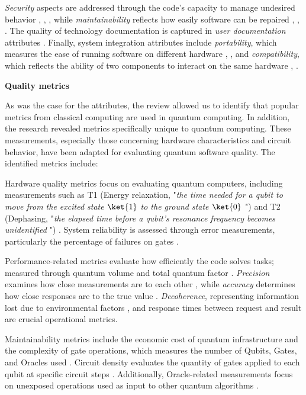 \textit{Security} aspects are addressed through the code's capacity to manage undesired behavior \cite{Wang2023}, \cite{Faryal2022}, \cite{30}, while \textit{maintainability} reflects how easily software can be repaired \cite{Wang2023}, \cite{Faryal2022}, \cite{30}. The quality of technology documentation is captured in \textit{user documentation} attributes \cite{Wang2023}. Finally, system integration attributes include \textit{portability}, which measures the ease of running software on different hardware \cite{Faryal2022}, \cite{30}, and \textit{compatibility}, which reflects the ability of two components to interact on the same hardware \cite{Faryal2022}, \cite{30}.

\noindent\textbf{Quality metrics}

As was the case for the attributes, the review allowed us to identify that popular metrics from classical computing are used in quantum computing. In addition, the research revealed metrics specifically unique to quantum computing. These measurements, especially those concerning hardware characteristics and circuit behavior, have been adapted for evaluating quantum software quality. The identified metrics include:

Hardware quality metrics focus on evaluating quantum computers, including measurements such as T1 (Energy relaxation, "\textit{the time needed for a qubit to move from the excited state $\ket{1}$ to the ground state $\ket{0}$} \cite{youssefMeasuringSimulatingT12020}") and T2 (Dephasing, "\textit{the elapsed time before a qubit's resonance frequency becomes unidentified} \cite{youssefMeasuringSimulatingT12020}") \cite{Alam2019}. System reliability is assessed through error measurements, particularly the percentage of failures on gates \cite{Alam2019}.

Performance-related metrics evaluate how efficiently the code solves tasks; measured through quantum volume and total quantum factor \cite{Verduro2021}. \textit{Precision} examines how close measurements are to each other \cite{Moguel2022}, while \textit{accuracy} determines how close responses are to the true value \cite{Verduro2021}. \textit{Decoherence}, representing information lost due to environmental factors \cite{Verduro2021}, and response times between request and result \cite{Moguel2022} are crucial operational metrics.

Maintainability metrics include the economic cost of quantum infrastructure \cite{Moguel2022} and the complexity of gate operations, which measures the number of Qubits, Gates, and Oracles used \cite{Moguel2022, 40, Díaz_Alvarado-Valiente_Romero-Álvarez_Moguel_Garcia-Alonso_Rodríguez_García-Rodríguez_Murillo_2025}. Circuit density evaluates the quantity of gates applied to each qubit at specific circuit steps \cite{26}. Additionally, Oracle-related measurements focus on unexposed operations used as input to other quantum algorithms \cite{26}.


